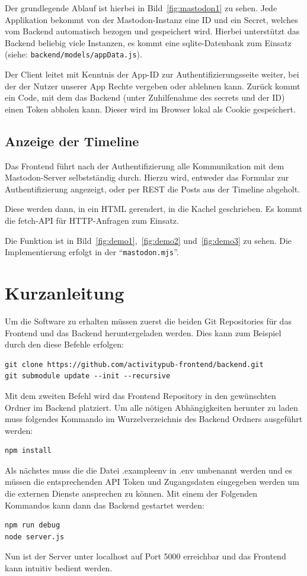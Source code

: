 \documentclass[fleqn,10pt]{SelfArx} %
\begin{document}
Der grundlegende Ablauf ist hierbei in Bild~\ref{fig:mastodon1} zu sehen. Jede Applikation bekommt von der Mastodon-Instanz eine ID und ein Secret, welches vom Backend automatisch bezogen und gespeichert wird. Hierbei unterstützt das Backend beliebig viele Instanzen, es kommt eine sqlite-Datenbank zum Einsatz (siehe: \texttt{backend/models/appData.js}).

Der Client leitet mit Kenntnis der App-ID zur Authentifizierungsseite weiter, bei der der Nutzer unserer App Rechte vergeben oder ablehnen kann. Zurück kommt ein Code, mit dem das Backend (unter Zuhilfenahme des secrets und der ID) einen Token abholen kann. Dieser wird im Browser lokal als Cookie gespeichert.
\subsection{Anzeige der Timeline}
Das Frontend führt nach der Authentifizierung alle Kommunikation mit dem Mastodon-Server selbstständig durch. Hierzu wird, entweder das Formular zur Authentifizierung angezeigt, oder per REST die Posts aus der Timeline abgeholt.

Diese werden dann, in ein HTML gerendert, in die Kachel geschrieben. Es kommt die fetch-API für HTTP-Anfragen zum Einsatz.

Die Funktion ist in Bild~\ref{fig:demo1},~\ref{fig:demo2} und~\ref{fig:demo3} zu sehen. Die Implementierung erfolgt in der \enquote{\texttt{mastodon.mjs}}.

\section{Kurzanleitung}
Um die Software zu erhalten müssen zuerst die beiden Git Repositories für das Frontend und das Backend heruntergeladen werden. Dies kann zum Beispiel durch den diese Befehle erfolgen:
\begin{lstlisting}
git clone https://github.com/activitypub-frontend/backend.git
git submodule update --init --recursive
\end{lstlisting}
Mit dem zweiten Befehl wird das Frontend Repository in den gewünschten Ordner im Backend platziert.
Um alle nötigen Abhängigkeiten herunter zu laden muss folgendes Kommando im Wurzelverzeichnis des Backend Ordners ausgeführt werden:
\begin{lstlisting}
npm install
\end{lstlisting}
Als nächstes muss die die Datei .exampleenv in .env umbenannt werden und es müssen die entsprechenden API Token und Zugangsdaten eingegeben werden um die externen Dienste ansprechen zu können.
Mit einem der Folgenden Kommandos kann dann das Backend gestartet werden:
\begin{lstlisting}
npm run debug
node server.js
\end{lstlisting}
Nun ist der Server unter localhost auf Port 5000 erreichbar und das Frontend kann intuitiv bedient werden.
\end{document}
